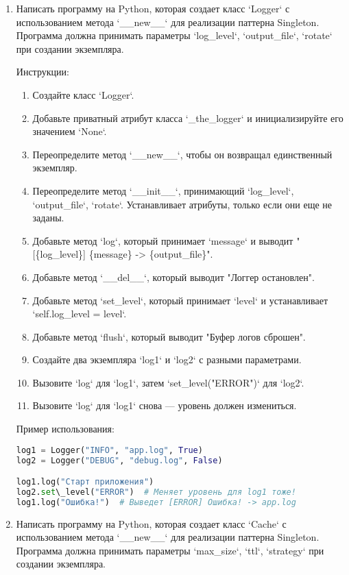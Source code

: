 \begin{enumerate}
\item Написать программу на Python, которая создает класс `Logger` с использованием метода `\_\_new\_\_` для реализации паттерна Singleton. Программа должна принимать параметры `log\_level`, `output\_file`, `rotate` при создании экземпляра.

Инструкции:
\begin{enumerate}
    \item Создайте класс `Logger`.
    \item Добавьте приватный атрибут класса `\_the\_logger` и инициализируйте его значением `None`.
    \item Переопределите метод `\_\_new\_\_`, чтобы он возвращал единственный экземпляр.
    \item Переопределите метод `\_\_init\_\_`, принимающий `log\_level`, `output\_file`, `rotate`. Устанавливает атрибуты, только если они еще не заданы.
    \item Добавьте метод `log`, который принимает `message` и выводит "[\{log\_level\}] \{message\} -> \{output\_file\}".
    \item Добавьте метод `\_\_del\_\_`, который выводит "Логгер остановлен".
    \item Добавьте метод `set\_level`, который принимает `level` и устанавливает `self.log\_level = level`.
    \item Добавьте метод `flush`, который выводит "Буфер логов сброшен".
    \item Создайте два экземпляра `log1` и `log2` с разными параметрами.
    \item Вызовите `log` для `log1`, затем `set\_level("ERROR")` для `log2`.
    \item Вызовите `log` для `log1` снова — уровень должен измениться.
\end{enumerate}

Пример использования:
\begin{lstlisting}[language=Python]
log1 = Logger("INFO", "app.log", True)
log2 = Logger("DEBUG", "debug.log", False)

log1.log("Старт приложения")
log2.set\_level("ERROR")  # Меняет уровень для log1 тоже!
log1.log("Ошибка!")  # Выведет [ERROR] Ошибка! -> app.log
\end{lstlisting}

\item Написать программу на Python, которая создает класс `Cache` с использованием метода `\_\_new\_\_` для реализации паттерна Singleton. Программа должна принимать параметры `max\_size`, `ttl`, `strategy` при создании экземпляра.


\end{enumerate}
